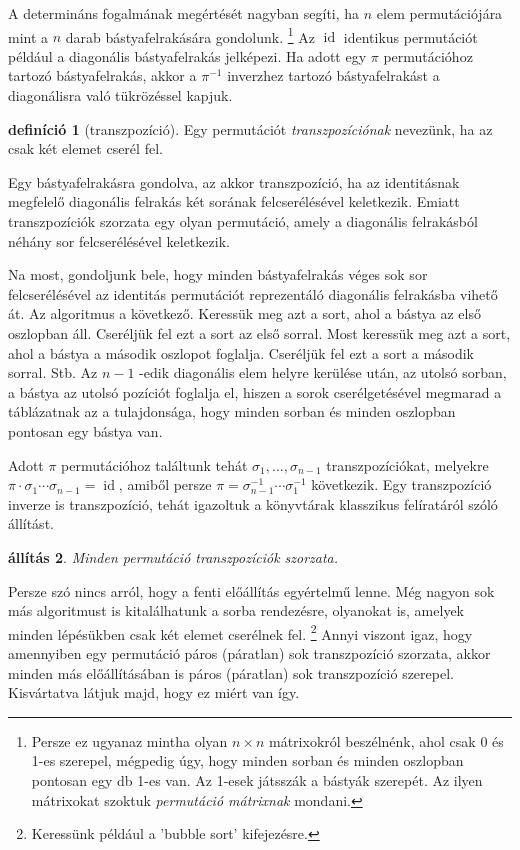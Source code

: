 \documentclass[a4paper, showtrims]{memoir}
\theoremstyle{plain}
\newtheorem{proposition}{állítás}[chapter]
\theoremstyle{remark}
\theoremstyle{definition}
\newtheorem{definition}[proposition]{definíció}
\DeclareMathOperator{\id}{id}
\begin{document}
A determináns fogalmának megértését nagyban segíti,
ha $n$ elem permutációjára mint a $n$ darab bástyafelrakására gondolunk.
\footnote{Persze ez ugyanaz mintha olyan $n\times n$ mátrixokról beszélnénk,
	ahol csak 0 és 1-es szerepel, mégpedig úgy, hogy minden sorban és minden oszlopban pontosan egy db 1-es van. Az 1-esek játsszák a bástyák szerepét. Az ilyen mátrixokat szoktuk \emph{permutáció mátrixnak} mondani.}
Az $\id$ identikus permutációt például a diagonális bástyafelrakás jelképezi.
Ha adott egy $\pi$ permutációhoz tartozó bástyafelrakás,
akkor a $\pi^{-1}$ inverzhez tartozó bástyafelrakást a diagonálisra való tükrözéssel kapjuk.
\begin{definition}[transzpozíció]
	Egy permutációt \emph{transzpozíciónak} nevezünk,
	ha az csak két elemet cserél fel.
\end{definition}
Egy bástyafelrakásra gondolva,
az akkor transzpozíció,
ha az identitásnak megfelelő diagonális felrakás két sorának felcserélésével keletkezik.
Emiatt transzpozíciók szorzata egy olyan permutáció,
amely a diagonális felrakásból néhány sor felcserélésével keletkezik.

Na most,
gondoljunk bele,
hogy minden bástyafelrakás véges sok sor felcserélésével az identitás permutációt reprezentáló diagonális felrakásba vihető át.
Az algoritmus a következő.
Keressük meg azt a sort,
ahol a bástya az első oszlopban áll.
Cseréljük fel ezt a sort az első sorral.
Most keressük meg azt a sort,
ahol a bástya a második oszlopot foglalja.
Cseréljük fel ezt a sort a második sorral.
Stb.
Az $n-1$ -edik diagonális elem helyre kerülése után, az utolsó sorban,
a bástya az utolsó pozíciót foglalja el,
hiszen a sorok cserélgetésével megmarad a táblázatnak az a tulajdonsága,
hogy minden sorban és minden oszlopban pontosan egy bástya van.

Adott $\pi$ permutációhoz találtunk tehát $\sigma_1,\ldots,\sigma_{n-1}$ transzpozíciókat,
melyekre $\pi\cdot\sigma_1\cdots\sigma_{n-1}=\id$, amiből persze
$\pi=\sigma_{n-1}^{-1}\cdots\sigma_1^{-1}$ következik.
Egy transzpozíció inverze is transzpozíció, tehát igazoltuk a könyvtárak klasszikus felíratáról
szóló állítást.
\begin{proposition}
	Minden permutáció transzpozíciók szorzata.
\end{proposition}
Persze szó nincs arról, hogy a fenti előállítás egyértelmű lenne.
Még nagyon sok más algoritmust is kitalálhatunk a sorba rendezésre,
olyanokat is,
amelyek minden lépésükben csak két elemet cserélnek fel.%
\footnote{Keressünk például a 'bubble sort' kifejezésre.}
Annyi viszont igaz,
hogy amennyiben egy permutáció páros (páratlan) sok transzpozíció szorzata,
akkor minden más előállításában is páros (páratlan) sok transzpozíció szerepel.
Kisvártatva látjuk majd, hogy ez miért van így.
\end{document}

